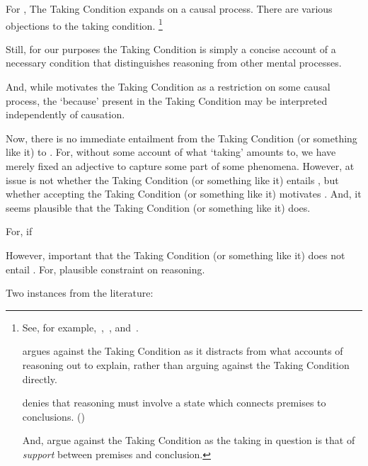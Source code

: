 \begin{note}
  For \citeauthor{Boghossian:2014aa}, The Taking Condition expands on a causal process.
  There are various objections to the taking condition.\nolinebreak
  \footnote{
    See, for example,~\textcite{Hlobil:2014tq},~\textcite{Wright:2014tt}, and~\textcite{McHugh:2016vp}.

    \citeauthor{Hlobil:2014tq} argues against the Taking Condition as it distracts from what accounts of reasoning out to explain, rather than arguing against the Taking Condition directly.

    \citeauthor{Wright:2014tt} denies that reasoning must involve a state which connects premises to conclusions. (\citeyear[Cf.][33-34]{Wright:2014tt})

    And, \citeauthor{McHugh:2016vp} argue against the Taking Condition as the taking in question is that of \emph{support} between premises and conclusion.
  }

  Still, for our purposes the Taking Condition is simply a concise account of a necessary condition that distinguishes reasoning from other mental processes.

  And, while \citeauthor{Boghossian:2014aa} motivates the Taking Condition as a restriction on some causal process, the `because' present in the Taking Condition may be interpreted independently of causation.
\end{note}

\begin{note}
  Now, there is no immediate entailment from the Taking Condition (or something like it) to \ESU{}.
  For, without some account of what `taking' amounts to, we have merely fixed an adjective to capture some part of some phenomena.
  However, at issue is not whether the Taking Condition (or something like it) entails \ESU{}, but whether accepting the Taking Condition (or something like it) motivates \ESU{}.
  And, it seems plausible that the Taking Condition (or something like it) does.

  For, if



  However, important that the Taking Condition (or something like it) does not entail \ESU{}.
  For, plausible constraint on reasoning.
\end{note}

\begin{note}
  Two instances from the literature:
\end{note}

